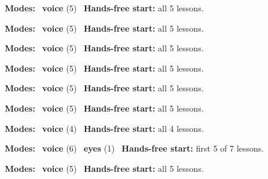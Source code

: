 \expandafter\def\csname hlchaptermodality312\endcsname{%
  {\small\noindent
    \textbf{Modes:} \hlvoicesign{}~\textbf{voice} (5)\quad
    \hlvoicesign{}~\textbf{Hands-free start:} all 5 lessons.%
    \par}\medskip
}

\expandafter\def\csname hlchaptermodality313\endcsname{%
  {\small\noindent
    \textbf{Modes:} \hlvoicesign{}~\textbf{voice} (5)\quad
    \hlvoicesign{}~\textbf{Hands-free start:} all 5 lessons.%
    \par}\medskip
}

\expandafter\def\csname hlchaptermodality314\endcsname{%
  {\small\noindent
    \textbf{Modes:} \hlvoicesign{}~\textbf{voice} (5)\quad
    \hlvoicesign{}~\textbf{Hands-free start:} all 5 lessons.%
    \par}\medskip
}

\expandafter\def\csname hlchaptermodality315\endcsname{%
  {\small\noindent
    \textbf{Modes:} \hlvoicesign{}~\textbf{voice} (5)\quad
    \hlvoicesign{}~\textbf{Hands-free start:} all 5 lessons.%
    \par}\medskip
}

\expandafter\def\csname hlchaptermodality316\endcsname{%
  {\small\noindent
    \textbf{Modes:} \hlvoicesign{}~\textbf{voice} (5)\quad
    \hlvoicesign{}~\textbf{Hands-free start:} all 5 lessons.%
    \par}\medskip
}

\expandafter\def\csname hlchaptermodality317\endcsname{%
  {\small\noindent
    \textbf{Modes:} \hlvoicesign{}~\textbf{voice} (5)\quad
    \hlvoicesign{}~\textbf{Hands-free start:} all 5 lessons.%
    \par}\medskip
}

\expandafter\def\csname hlchaptermodality318\endcsname{%
  {\small\noindent
    \textbf{Modes:} \hlvoicesign{}~\textbf{voice} (4)\quad
    \hlvoicesign{}~\textbf{Hands-free start:} all 4 lessons.%
    \par}\medskip
}

\expandafter\def\csname hlchaptermodality319\endcsname{%
  {\small\noindent
    \textbf{Modes:} \hlvoicesign{}~\textbf{voice} (6) \quad \hlsightsign{}~\textbf{eyes} (1)\quad
    \hlvoicesign{}~\textbf{Hands-free start:} first 5 of 7 lessons.%
    \par}\medskip
}

\expandafter\def\csname hlchaptermodality320\endcsname{%
  {\small\noindent
    \textbf{Modes:} \hlvoicesign{}~\textbf{voice} (5)\quad
    \hlvoicesign{}~\textbf{Hands-free start:} all 5 lessons.%
    \par}\medskip
}

